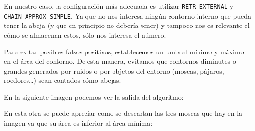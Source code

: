 En nuestro caso, la configuración más adecuada es utilizar
\texttt{RETR\_EXTERNAL} y \texttt{CHAIN\_APPROX\_SIMPLE}. Ya que no nos
interesa ningún contorno interno que pueda tener la abeja (y que en
principio no debería tener) y tampoco nos es relevante el cómo se
almacenan estos, sólo nos interesa el número.

Para evitar posibles falsos positivos, establecemos un umbral mínimo y
máximo en el área del contorno. De esta manera, evitamos que contornos
diminutos o grandes generados por ruidos o por objetos del entorno
(moscas, pájaros, roedores\ldots{}) sean contados cómo abejas.

En la siguiente imagen podemos ver la salida del algoritmo:


En esta otra se puede apreciar como se descartan las tres moscas que hay
en la imagen ya que su área es inferior al área mínima:

